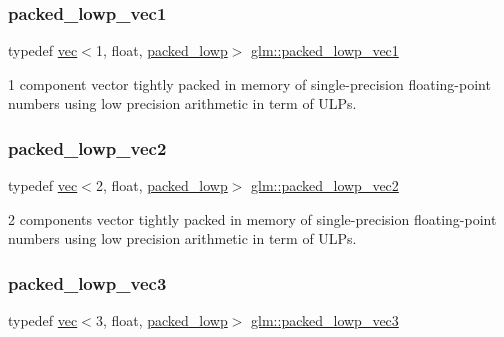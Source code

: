 \subsubsection{\texorpdfstring{packed\+\_\+lowp\+\_\+vec1}{packed\_lowp\_vec1}}
{\footnotesize\ttfamily typedef \mbox{\hyperlink{structglm_1_1vec}{vec}}$<$1, float, \mbox{\hyperlink{namespaceglm_a36ed105b07c7746804d7fdc7cc90ff25ac36a4bd74559be2c0b65bc48e5953b8b}{packed\+\_\+lowp}}$>$ \mbox{\hyperlink{group__gtc__type__aligned_ga23472ebc3f98baab2a17053bc3788a9c}{glm\+::packed\+\_\+lowp\+\_\+vec1}}}



1 component vector tightly packed in memory of single-\/precision floating-\/point numbers using low precision arithmetic in term of U\+L\+Ps. 

\mbox{\label{group__gtc__type__aligned_ga5457fdfd08276277a86cb27e1da6aa9c}} 
\subsubsection{\texorpdfstring{packed\+\_\+lowp\+\_\+vec2}{packed\_lowp\_vec2}}
{\footnotesize\ttfamily typedef \mbox{\hyperlink{structglm_1_1vec}{vec}}$<$2, float, \mbox{\hyperlink{namespaceglm_a36ed105b07c7746804d7fdc7cc90ff25ac36a4bd74559be2c0b65bc48e5953b8b}{packed\+\_\+lowp}}$>$ \mbox{\hyperlink{group__gtc__type__aligned_ga5457fdfd08276277a86cb27e1da6aa9c}{glm\+::packed\+\_\+lowp\+\_\+vec2}}}



2 components vector tightly packed in memory of single-\/precision floating-\/point numbers using low precision arithmetic in term of U\+L\+Ps. 

\mbox{\label{group__gtc__type__aligned_ga64f20313965454ec7bd89f62ea4946ba}} 
\subsubsection{\texorpdfstring{packed\+\_\+lowp\+\_\+vec3}{packed\_lowp\_vec3}}
{\footnotesize\ttfamily typedef \mbox{\hyperlink{structglm_1_1vec}{vec}}$<$3, float, \mbox{\hyperlink{namespaceglm_a36ed105b07c7746804d7fdc7cc90ff25ac36a4bd74559be2c0b65bc48e5953b8b}{packed\+\_\+lowp}}$>$ \mbox{\hyperlink{group__gtc__type__aligned_ga64f20313965454ec7bd89f62ea4946ba}{glm\+::packed\+\_\+lowp\+\_\+vec3}}}



